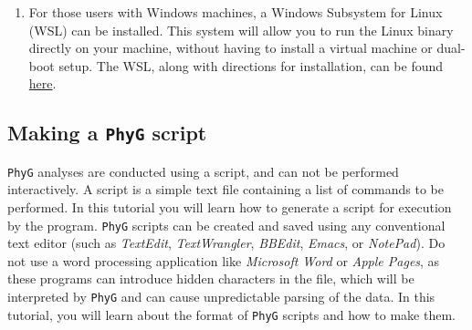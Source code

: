 \documentclass[11pt]{article}
\newcommand{\phyg}{\texttt{PhyG} }
\begin{document}
\begin{enumerate}
	\begin{quote}
	sudo mv ~/Desktop/phyg /usr/local/bin
	\end{quote}
	
\item For those users with Windows machines, a Windows Subsystem for Linux 
(WSL) can be installed. This system will allow you to run the Linux binary directly 
on your machine, without having to install a virtual machine or dual-boot setup. 
The WSL, along with directions for installation, can be found 
\href{https://learn.microsoft.com/en-us/windows/wsl/}{here}.
\end{enumerate}

\subsection{Making a \phyg script}
\label{subsec:Scripts}

\phyg analyses are conducted using a script, and can not be performed interactively. 
A script is a simple text file containing a list of commands to be performed. In this 
tutorial you will learn how to generate a script for execution by the program. \phyg 
scripts can be created and saved using any conventional text editor (such as 
\textit{TextEdit}, \textit{TextWrangler}, \textit{BBEdit}, \textit{Emacs}, or \textit{NotePad}). 
Do not use a word processing application like \emph{Microsoft Word} or \emph{Apple 
Pages}, as these programs can introduce hidden characters in the file, which will be 
interpreted by \phyg and can cause unpredictable parsing of the data. In this tutorial, 
you will learn about the format of \phyg scripts and how to make them.
\end{document}
